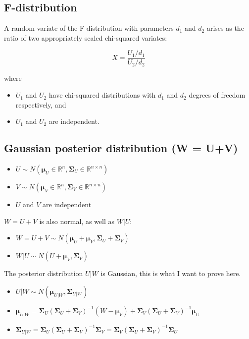 \documentclass{article}
\begin{document}
\begin{appendices}
\subsection{F-distribution} \label{app:F_distribution}

A random variate of the F-distribution with parameters $d_1$ and $d_2$ arises as the ratio of two appropriately scaled chi-squared variates:

\begin{equation}
    X = \frac{U_1 / d_1}{U_2 / d_2}
\end{equation}

where

\begin{itemize}
    \item $U_{1}$ and $U_{2}$ have chi-squared distributions with $d_{1}$ and $d_{2}$ degrees of freedom respectively, and
    \item $U_{1}$ and $U_{2}$ are independent.
\end{itemize}

\subsection{Gaussian posterior distribution (W = U+V)}

\begin{itemize}
    \item $U \sim N(\bm{\mu}_U \in \mathbb{R}^n, \bm{\Sigma}_U \in \mathbb{R}^{n\times n})$
    \item $V \sim N(\bm{\mu}_V \in \mathbb{R}^n, \bm{\Sigma}_V \in \mathbb{R}^{n\times n})$
    \item $U$ and $V$ are independent
\end{itemize}

$W = U + V$ is also normal, as well as $W|U$:

\begin{itemize}
    \item $W = U + V \sim N(\bm{\mu}_U + \bm{\mu}_V, \bm{\Sigma}_U + \bm{\Sigma}_V)$
    \item $W|U \sim N(U + \bm{\mu}_V, \bm{\Sigma}_V)$
\end{itemize}

The posterior distribution $U|W$ is Gaussian, this is what I want to prove here.

\begin{itemize}
    \item $U|W \sim N(\bm{\mu}_{U|W}, \bm{\Sigma}_{U|W})$
    \item $\bm{\mu}_{U|W} = \bm{\Sigma}_U (\bm{\Sigma}_U + \bm{\Sigma}_V)^{-1} (W - \bm{\mu}_V) + \bm{\Sigma}_V (\bm{\Sigma}_U + \bm{\Sigma}_V)^{-1}\bm{\mu}_U$
    \item $\bm{\Sigma}_{U|W} = \bm{\Sigma}_U (\bm{\Sigma}_U + \bm{\Sigma}_V)^{-1} \bm{\Sigma}_V = \bm{\Sigma}_V (\bm{\Sigma}_U + \bm{\Sigma}_V)^{-1} \bm{\Sigma}_U$
\end{itemize}


\end{appendices}
\end{document}
